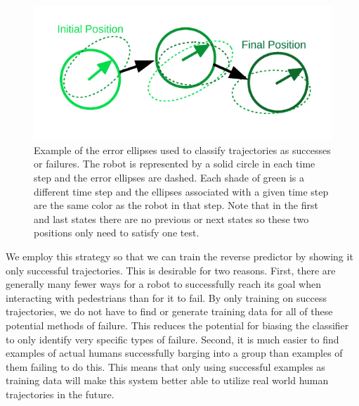 \documentclass[letterpaper, 10 pt, conference]{ieeeconf}  %
\begin{document}
		\begin{figure}
			\centering
			\includegraphics[width=\linewidth]{success_ellipses}
			\caption{Example of the error ellipses used to classify trajectories as successes or failures. The robot is represented by a solid circle in each time step and the error ellipses are dashed. Each shade of green is a different time step and the ellipses associated with a given time step are the same color as the robot in that step. Note that in the first and last states there are no previous or next states so these two positions only need to satisfy one test.}
			\label{fig:success_ellipses}
		\end{figure}
	
		We employ this strategy so that we can train the reverse predictor by showing it only successful trajectories. This is desirable for two reasons. First, there are generally many fewer ways for a robot to successfully reach its goal when interacting with pedestrians than for it to fail. By only training on success trajectories, we do not have to find or generate training data for all of these potential methods of failure. This reduces the potential for biasing the classifier to only identify very specific types of failure. Second, it is much easier to find examples of actual humans successfully barging into a group than examples of them failing to do this. This means that only using successful examples as training data will make this system better able to utilize real world human trajectories in the future.
	
\end{document}
